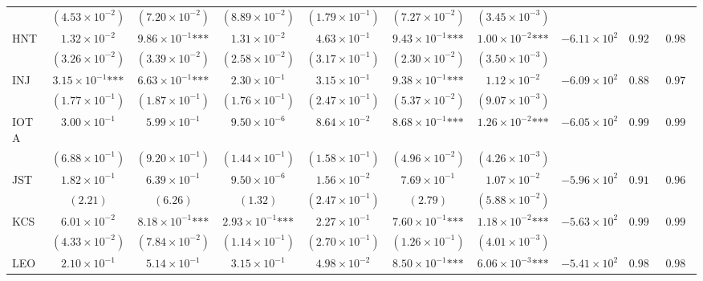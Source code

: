 \documentclass{article}
\begin{document}
\begin{landscape}
\begin{longtable}{lccccccccc}
 & $(4.53\times 10^{-2})$ & $(7.20\times 10^{-2})$ & $(8.89\times 10^{-2})$ & $(1.79\times 10^{-1})$ & $(7.27\times 10^{-2})$ & $(3.45\times 10^{-3})$ &  &  &  \\
HNT & $1.32\times 10^{-2}$ & $9.86\times 10^{-1}\text{***}$ & $1.31\times 10^{-2}$ & $4.63\times 10^{-1}$ & $9.43\times 10^{-1}\text{***}$ & $1.00\times 10^{-2}\text{***}$ & $-6.11\times 10^{2}$ & $0.925$ & $0.982$ \\
 & $(3.26\times 10^{-2})$ & $(3.39\times 10^{-2})$ & $(2.58\times 10^{-2})$ & $(3.17\times 10^{-1})$ & $(2.30\times 10^{-2})$ & $(3.50\times 10^{-3})$ &  &  &  \\
INJ & $3.15\times 10^{-1}\text{***}$ & $6.63\times 10^{-1}\text{***}$ & $2.30\times 10^{-1}$ & $3.15\times 10^{-1}$ & $9.38\times 10^{-1}\text{***}$ & $1.12\times 10^{-2}$ & $-6.09\times 10^{2}$ & $0.881$ & $0.971$ \\
 & $(1.77\times 10^{-1})$ & $(1.87\times 10^{-1})$ & $(1.76\times 10^{-1})$ & $(2.47\times 10^{-1})$ & $(5.37\times 10^{-2})$ & $(9.07\times 10^{-3})$ &  &  &  \\
IOTA & $3.00\times 10^{-1}$ & $5.99\times 10^{-1}$ & $9.50\times 10^{-6}$ & $8.64\times 10^{-2}$ & $8.68\times 10^{-1}\text{***}$ & $1.26\times 10^{-2}\text{***}$ & $-6.05\times 10^{2}$ & $0.991$ & $0.997$ \\
 & $(6.88\times 10^{-1})$ & $(9.20\times 10^{-1})$ & $(1.44\times 10^{-1})$ & $(1.58\times 10^{-1})$ & $(4.96\times 10^{-2})$ & $(4.26\times 10^{-3})$ &  &  &  \\
JST & $1.82\times 10^{-1}$ & $6.39\times 10^{-1}$ & $9.50\times 10^{-6}$ & $1.56\times 10^{-2}$ & $7.69\times 10^{-1}$ & $1.07\times 10^{-2}$ & $-5.96\times 10^{2}$ & $0.913$ & $0.969$ \\
 & $(2.21)$ & $(6.26)$ & $(1.32)$ & $(2.47\times 10^{-1})$ & $(2.79)$ & $(5.88\times 10^{-2})$ &  &  &  \\
KCS & $6.01\times 10^{-2}$ & $8.18\times 10^{-1}\text{***}$ & $2.93\times 10^{-1}\text{***}$ & $2.27\times 10^{-1}$ & $7.60\times 10^{-1}\text{***}$ & $1.18\times 10^{-2}\text{***}$ & $-5.63\times 10^{2}$ & $0.990$ & $0.991$ \\
 & $(4.33\times 10^{-2})$ & $(7.84\times 10^{-2})$ & $(1.14\times 10^{-1})$ & $(2.70\times 10^{-1})$ & $(1.26\times 10^{-1})$ & $(4.01\times 10^{-3})$ &  &  &  \\
LEO & $2.10\times 10^{-1}$ & $5.14\times 10^{-1}$ & $3.15\times 10^{-1}$ & $4.98\times 10^{-2}$ & $8.50\times 10^{-1}\text{***}$ & $6.06\times 10^{-3}\text{***}$ & $-5.41\times 10^{2}$ & $0.980$ & $0.983$ \\

\end{longtable}
\end{landscape}
\end{document}
